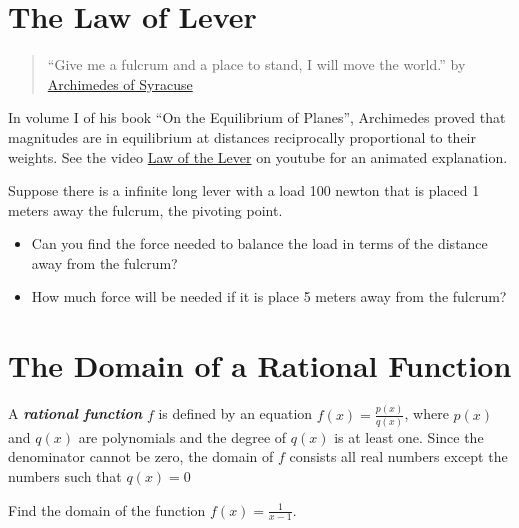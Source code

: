 \documentclass[en,11pt]{elegantbook}
\newcommand{\size}[2]{{\fontsize{#1}{0}\selectfont#2}}
\newenvironment{rmdthink}{
	\vspace*{0.5\baselineskip}
	\par\noindent
	\makebox[-4pt][r]{\color{green!90}\size{12}{\faLightbulbO}\,\,}
    \begin{tcolorbox}[
    enhanced,
    title={\textbf{\color{second}Think}},
    title style={left color=blue!10!green!20!white,right color=yellow!20!blue!20!white},
    colback=green!20!white,
    ]
    \sffamily
}{
    \end{tcolorbox}
	\par\ignorespacesafterend
}
\let\BeginKnitrBlock\begin \let\EndKnitrBlock\end
\begin{document}
\hypertarget{the-law-of-lever}{%
\section{The Law of Lever}\label{the-law-of-lever}}

\begin{rmdthink}

\begin{quote}
``Give me a fulcrum and a place to stand, I will move the world.'' by \href{https://en.wikipedia.org/wiki/Archimedes\#Mathematics}{Archimedes of Syracuse}
\end{quote}

In volume I of his book ``On the Equilibrium of Planes'', Archimedes proved that magnitudes are in equilibrium at distances reciprocally proportional to their weights. See the video \href{https://youtu.be/yhrR4384SGE?t=8}{Law of the Lever} on youtube for an animated explanation.

Suppose there is a infinite long lever with a load 100 newton that is placed 1 meters away the fulcrum, the pivoting point.

\begin{itemize}

\item
  Can you find the force needed to balance the load in terms of the distance away from the fulcrum?
\item
  How much force will be needed if it is place 5 meters away from the fulcrum?
\end{itemize}

\end{rmdthink}

\hypertarget{the-domain-of-a-rational-function}{%
\section{The Domain of a Rational Function}\label{the-domain-of-a-rational-function}}

A \textbf{\emph{rational function}} \(f\) is defined by an equation \(f(x)=\frac{p(x)}{q(x)}\), where \(p(x)\) and \(q(x)\) are polynomials and the degree of \(q(x)\) is at least one. Since the denominator cannot be zero, the domain of \(f\) consists all real numbers except the numbers such that \(q(x)=0\)

\BeginKnitrBlock{example}
\protect\hypertarget{exm:unnamed-chunk-271}{}{\label{exm:unnamed-chunk-271} }
Find the domain of the function \(f(x)=\frac{1}{x-1}\).
\EndKnitrBlock{example}
\end{document}
